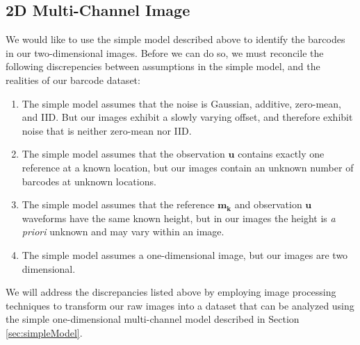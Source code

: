 \subsection{2D Multi-Channel Image}
We would like to use the simple model described above to identify the barcodes in our two-dimensional images. Before we can do so, we must reconcile the following discrepencies between assumptions in the simple model, and the realities of our barcode dataset:
	\begin{enumerate} %
	\item The simple model assumes that the noise is Gaussian, additive, zero-mean, and IID. But our images exhibit a slowly varying offset, and therefore exhibit noise that is neither zero-mean nor IID. \label{item:noise}
	\item The simple model assumes that the observation $\mathbf{u}$ contains exactly one reference at a known location, but our images contain an unknown number of barcodes at unknown locations. 
	\item The simple model assumes that the reference $\mathbf{m_k}$ and observation $\mathbf{u}$ waveforms have the same known height, but in our images the height is \textit{a priori} unknown and may vary within an image.  
	\item The simple model assumes a one-dimensional image, but our images are two dimensional.
	\end{enumerate} 
We will address  the discrepancies listed above by employing image processing techniques to transform our raw images into a dataset that can be analyzed using the simple one-dimensional multi-channel model described in Section \ref{sec:simpleModel}. 

